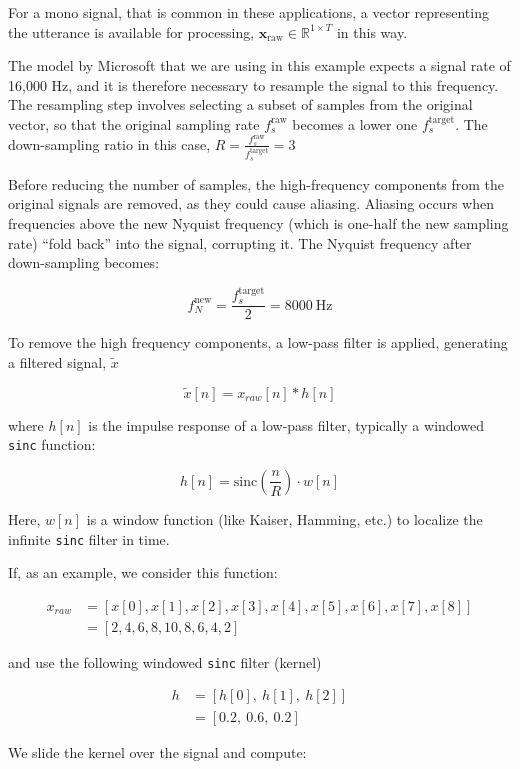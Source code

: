 \documentclass[conference]{IEEEtran}
\begin{document}
For a mono signal, that is common in these applications, a vector representing the utterance is available for processing,  $\mathbf{x}_{\text{raw}} \in \mathbb{R}^{1 \times T}$ in this way.


The model by Microsoft that we are using in this example expects a signal rate of 16,000 Hz, and it is therefore necessary to resample the signal to this frequency. The resampling step involves selecting a subset of samples from the original vector, so that the original sampling rate $f_s^{\text{raw}}$ becomes a lower one $f_s^{\text{target}}$. The down-sampling ratio in this case, $R = \frac{f_s^{\text{raw}}}{f_s^{\text{target}}} = 3$


Before reducing the number of samples, the high-frequency components from the original signals are removed, as they could cause aliasing. Aliasing occurs when frequencies above the new Nyquist frequency (which is one-half the new sampling rate) “fold back” into the signal, corrupting it. The Nyquist frequency after down-sampling becomes:

$$f_N^{\text{new}} = \frac{f_s^{\text{target}}}{2} = 8000~\text{Hz}$$

To remove the high frequency components, a low-pass filter is applied, generating a filtered signal, $\tilde{x}$

$$\tilde{x}[n] = x_{raw}[n] * h[n]$$

where $h[n]$ is the impulse response of a low-pass filter, typically a windowed \texttt{sinc} function:

$$h[n] = \text{sinc}\left(\frac{n}{R}\right) \cdot w[n]$$

Here, $w[n]$ is a window function (like Kaiser, Hamming, etc.) to localize the infinite \texttt{sinc} filter in time.

If, as an example, we consider this function:

\begin{align*}
	x_{raw} &=[x[0], x[1], x[2], x[3], x[4], x[5], x[6], x[7], x[8]]\\
		 	&=[2, 4, 6, 8, 10, 8, 6, 4, 2]
\end{align*}

and use the following windowed \texttt{sinc} filter (kernel)

\begin{align*}
	h &= [h[0],\ h[1],\ h[2]]\\
	  &= [0.2,\ 0.6,\ 0.2]
\end{align*}

We slide the kernel over the signal and compute:
\end{document}
